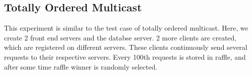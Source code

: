 \documentclass{article}
\begin{document}
\subsection{Totally Ordered Multicast}
This experiment is similar to the test case of totally ordered multicast.
Here, we create 2 front end servers and the databse server. 2 more clients
are created, which are registered on different servers. These clients
continuously send several requests to their respective servers.
Every 100th requests is stored in raffle, and after some time raffle 
winner is randomly selected.
\end{document}
